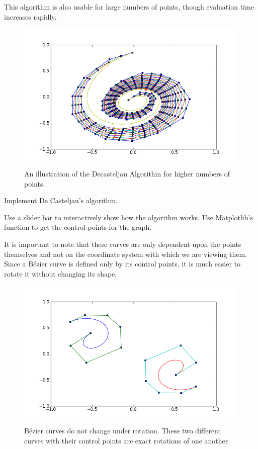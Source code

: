This algorithm is also usable for large numbers of points, though evaluation time increases rapidly.

\begin{figure}
\includegraphics[width=\textwidth]{decasteljau_6}
\caption{An illustration of the Decasteljau Algorithm for higher numbers of points.}
\end{figure}

\begin{problem}
Implement De Casteljau's algorithm.
\end{problem}

\begin{problem}
Use a slider bar to interactively show how the algorithm works. 
Use Matplotlib's  function to get the control points for the graph.
\end{problem}

It is important to note that these curves are only dependent upon the points themselves and not on the coordinate system with which we are viewing them. 
Since a B\'{e}zier curve is defined only by its control points, it is much easier to rotate it without changing its shape.

\begin{figure}
\includegraphics[width=\textwidth]{bezier_rotation}
\caption{B\'{e}zier curves do not change under rotation. These two different curves with their control points are exact rotations of one another}
\end{figure}

